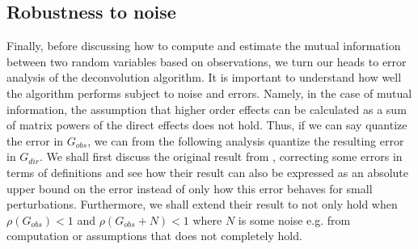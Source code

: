 \documentclass[../Thesis.tex]{subfiles}
\begin{document}
\subsection{Robustness to noise}\label{subseq:Robustness to noise}
Finally, before discussing how to compute and estimate the mutual information between two random variables based on observations, we turn our heads to error analysis of the deconvolution algorithm. It is important to understand how well the algorithm performs subject to noise and errors. Namely, in the case of mutual information, the assumption that higher order effects can be calculated as a sum of matrix powers of the direct effects does not hold. Thus, if we can say quantize the error in $G_{obs}$, we can from the following analysis quantize the resulting error in $G_{dir}$. We shall first discuss the original result from \cite{Network-deconvolution-as-a-general-method-to-distinguish-direct-dependencies-in-networks}, correcting some errors in terms of definitions and see how their result can also be expressed as an absolute upper bound on the error instead of only how this error behaves for small perturbations. Furthermore, we shall extend their result to not only hold when $\rho\left(G_{obs}\right) < 1$ and $\rho\left(G_{obs} + N\right) < 1$ where $N$ is some noise e.g. from computation or assumptions that does not completely hold.

\end{document}
